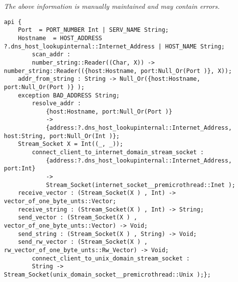 \label{api:Posix\_Socket\_Junk}

{\tiny \it The above information is manually maintained and may contain errors.}
\begin{verbatim}
api {
    Port  = PORT_NUMBER Int | SERV_NAME String;
    Hostname  = HOST_ADDRESS ?.dns_host_lookupinternal::Internet_Address | HOST_NAME String;
        scan_addr :
        number_string::Reader((Char, X)) -> number_string::Reader(({host:Hostname, port:Null_Or(Port )}, X));
    addr_from_string : String -> Null_Or({host:Hostname, port:Null_Or(Port )} );
    exception BAD_ADDRESS String;
        resolve_addr :
            {host:Hostname, port:Null_Or(Port )}
            ->
            {address:?.dns_host_lookupinternal::Internet_Address, host:String, port:Null_Or(Int )};
    Stream_Socket X = Int((_, _));
        connect_client_to_internet_domain_stream_socket :
            {address:?.dns_host_lookupinternal::Internet_Address, port:Int}
            ->
            Stream_Socket(internet_socket__premicrothread::Inet );
    receive_vector : (Stream_Socket(X ) , Int) -> vector_of_one_byte_unts::Vector;
    receive_string : (Stream_Socket(X ) , Int) -> String;
    send_vector : (Stream_Socket(X ) , vector_of_one_byte_unts::Vector) -> Void;
    send_string : (Stream_Socket(X ) , String) -> Void;
    send_rw_vector : (Stream_Socket(X ) , rw_vector_of_one_byte_unts::Rw_Vector) -> Void;
        connect_client_to_unix_domain_stream_socket :
        String -> Stream_Socket(unix_domain_socket__premicrothread::Unix );};
\end{verbatim}
